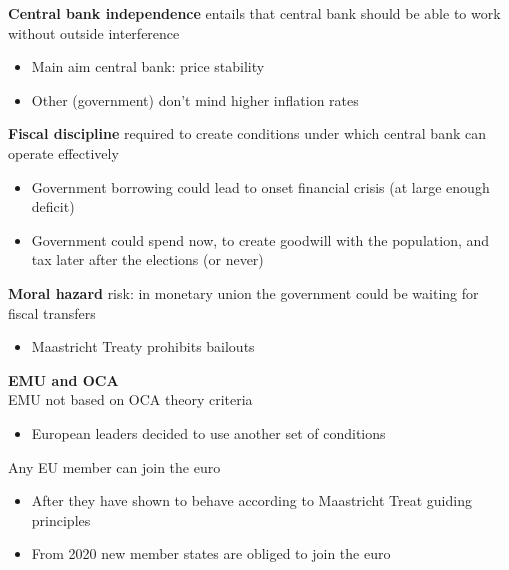 \documentclass{beamer}
\begin{document}
\begin{frame}
  \textbf{Central bank independence} entails that central bank should be able to work without outside interference
  \begin{itemize}
    \item Main aim central bank: price stability
    \item Other (government) don't mind higher inflation rates 
  \end{itemize}  
\end{frame}

\begin{frame}
  \textbf{Fiscal discipline} required to create conditions under which central bank can operate effectively
  \begin{itemize}
    \item Government borrowing could lead to onset financial crisis (at large enough deficit)
    \item Government could spend now, to create goodwill with the population, and tax later after the elections (or never)  
  \end{itemize}
  \medskip
   \textbf{Moral hazard} risk: in monetary union the government could be waiting for fiscal transfers
   \begin{itemize}
     \item Maastricht Treaty prohibits bailouts 
   \end{itemize}    
\end{frame}


\begin{frame} 
  \textbf{EMU and OCA}\\
  \medskip
  EMU not based on OCA theory criteria  
  \begin{itemize}
    \item European leaders decided to use another set of conditions
  \end{itemize}
  \medskip
  Any EU member can join the euro
\begin{itemize}
  \item After they have shown to behave according to Maastricht Treat guiding principles
  \item From 2020 new member states are obliged to join the euro
\end{itemize}
\end{frame}
\end{document}
